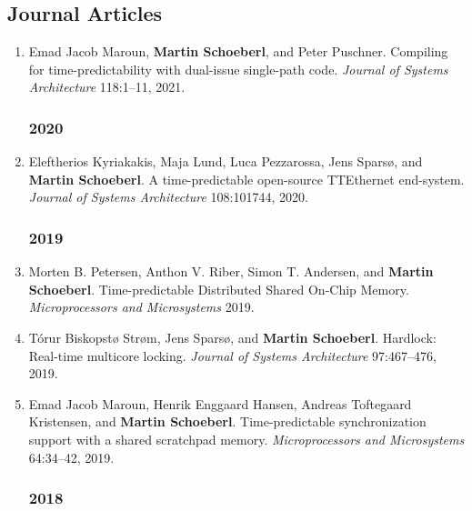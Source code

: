 \subsection*{Journal Articles}

\begin{enumerate}

\subsubsection*{2021}

\item Emad Jacob Maroun, {\bf Martin Schoeberl}, and Peter Puschner.
 Compiling for time-predictability with dual-issue single-path code.
 \emph{Journal of Systems Architecture} 118:1--11, 2021.


\subsubsection*{2020}

\item Eleftherios Kyriakakis, Maja Lund, Luca Pezzarossa, Jens Spars{\o}, and {\bf Martin Schoeberl}.
 A time-predictable open-source TTEthernet end-system.
 \emph{Journal of Systems Architecture} 108:101744, 2020.


\subsubsection*{2019}

\item Morten B. Petersen, Anthon V. Riber, Simon T. Andersen, and {\bf Martin Schoeberl}.
 Time-predictable Distributed Shared On-Chip Memory.
 \emph{Microprocessors and Microsystems} 2019.

\item T{\'o}rur Biskopst{\o} Str{\o}m, Jens Spars{\o}, and {\bf Martin Schoeberl}.
 Hardlock: Real-time multicore locking.
 \emph{Journal of Systems Architecture} 97:467--476, 2019.

\item Emad Jacob Maroun, Henrik Enggaard Hansen, Andreas Toftegaard Kristensen, and {\bf Martin Schoeberl}.
 Time-predictable synchronization support with a shared scratchpad memory.
 \emph{Microprocessors and Microsystems} 64:34--42, 2019.


\subsubsection*{2018}


\end{enumerate}
